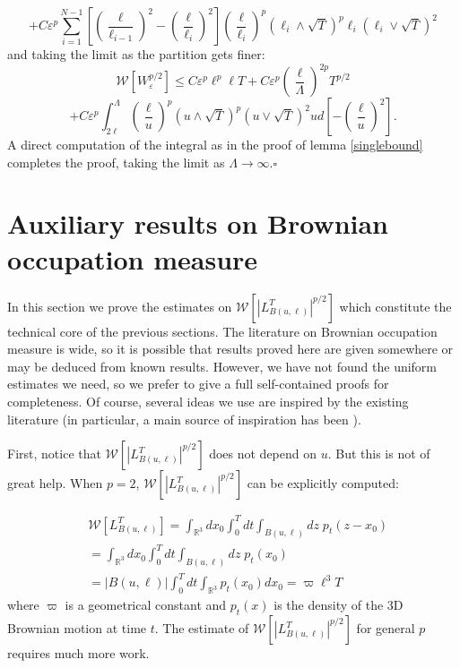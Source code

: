 \documentclass[a4paper,12pt]{article}
\begin{document}
\[
+C\varepsilon^{p}\sum_{i=1}^{N-1}\left[  \left(  \frac{\ell}{\ell_{i-1}%
}\right)  ^{2}-\left(  \frac{\ell}{\ell_{i}}\right)  ^{2}\right]  \left(
\frac{\ell}{\ell_{i}}\right)  ^{p}(\ell_{i}\wedge\sqrt{T})^{p}\ell_{i}%
(\ell_{i}\vee\sqrt{T})^{2}%
\]
and taking the limit as the partition gets finer:
\[
\mathcal{W}\left[  W_{\varepsilon}^{p/2}\right]  \leq C\varepsilon^{p}\ell
^{p}\ell T+C\varepsilon^{p}\left(  \frac{\ell}{\Lambda}\right)  ^{2p}T^{p/2}%
\]%
\[
+C\varepsilon^{p}\int_{2\ell}^{\Lambda}\left(  \frac{\ell}{u}\right)
^{p}(u\wedge\sqrt{T})^{p}(u\vee\sqrt{T})^{2}ud\left[  -\left(  \frac{\ell}%
{u}\right)  ^{2}\right]  .
\]
A direct computation of the integral as in the proof of lemma
\ref{singlebound} completes the proof, taking the limit as $\Lambda
\rightarrow\infty$.\hfill$\square$

\section{Auxiliary results on Brownian occupation measure}

In this section we prove the estimates on $\mathcal{W}[|L_{B(u,\ell)}%
^{T}|^{p/2}]$ which constitute the technical core of the previous sections.
The literature on Brownian occupation measure is wide, so it is possible that
results proved here are given somewhere or may be deduced from known results.
However, we have not found the uniform estimates we need, so we prefer to give
a full self-contained proofs for completeness. Of course, several ideas we use
are inspired by the existing literature (in particular, a main source of
inspiration has been \cite{LGall}).

First, notice that $\mathcal{W}[|L_{B(u,\ell)}^{T}|^{p/2}]$ does not depend on
$u$. But this is not of great help. When $p=2$, $\mathcal{W}[|L_{B(u,\ell
)}^{T}|^{p/2}]$ can be explicitly computed:%

\begin{align*}
&  \mathcal{W}[L_{B(u,\ell)}^{T}]=\int_{\mathbb{R}^{3}}dx_{0}\int_{0}%
^{T}dt\int_{B(u,\ell)}dz\;p_{t}\left(  z-x_{0}\right) \\
&  =\int_{\mathbb{R}^{3}}dx_{0}\int_{0}^{T}dt\int_{B(u,\ell)}dz\;p_{t}\left(
x_{0}\right) \\
&  =|B(u,\ell)|\int_{0}^{T}dt\int_{\mathbb{R}^{3}}p_{t}\left(  x_{0}\right)
dx_{0}=\varpi\ell^{3}T
\end{align*}
where $\varpi$ is a geometrical constant and $p_{t}\left(  x\right)  $ is the
density of the 3D Brownian motion at time $t$. The estimate of $\mathcal{W}%
[|L_{B(u,\ell)}^{T}|^{p/2}]$ for general $p$ requires much more work.
\end{document}
